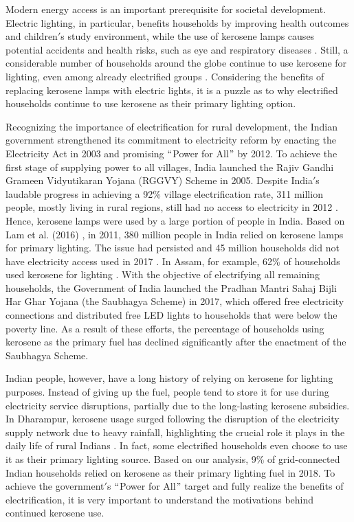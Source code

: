 \documentclass[11pt,english]{article}
\theoremstyle{plain} \newtheorem{claim}{Claim}
\theoremstyle{plain} \newtheorem{prop}{Proposition}
\theoremstyle{plain} \newtheorem{hypo}{Hypothesis}
\begin{document}
Modern energy access is an important prerequisite for societal development. Electric lighting, in particular, benefits households by improving health outcomes and children$'$s study environment, while the use of kerosene lamps causes potential accidents and health risks, such as eye and respiratory diseases \citep{Vandewalleetal2013, BarronTorero2017, Bruceetal2000, Worldbank2008}. Still, a considerable number of households around the globe continue to use kerosene for lighting, even among already electrified groups \citep{Lametal2016}. Considering the benefits of replacing kerosene lamps with electric lights, it is a puzzle as to why electrified households continue to use kerosene as their primary lighting option.

Recognizing the importance of electrification for rural development, the Indian government strengthened its commitment to electricity reform by enacting the Electricity Act in 2003 and promising $``$Power for All$"$ by 2012. To achieve the first stage of supplying power to all villages, India launched the Rajiv Gandhi Grameen Vidyutikaran Yojana (RGGVY) Scheme in 2005. Despite India$'$s laudable progress in achieving a 92\% village electrification rate, 311 million people, mostly living in rural regions, still had no access to electricity in 2012 \citep{Banerjeeetal2014}. Hence, kerosene lamps were used by a large portion of people in India. Based on Lam et al. (2016) \citep{Lametal2016}, in 2011, 380 million people in India relied on kerosene lamps for primary lighting. The issue had persisted and 45 million households did not have electricity access used in 2017 \citep{PalitBandyopadhyay2017}. In Assam, for example, 62\% of households used kerosene for lighting \citep{Barmanetal2017}. With the objective of electrifying all remaining households, the Government of India launched the Pradhan Mantri Sahaj Bijli Har Ghar Yojana (the Saubhagya Scheme) in 2017, which offered free electricity connections and distributed free LED lights to households that were below the poverty line. As a result of these efforts, the percentage of households using kerosene as the primary fuel has declined significantly after the enactment of the Saubhagya Scheme.

Indian people, however, have a long history of relying on kerosene for lighting purposes. Instead of giving up the fuel, people tend to store it for use during electricity service disruptions, partially due to the long-lasting kerosene subsidies. In Dharampur, kerosene usage surged following the disruption of the electricity supply network due to heavy rainfall, highlighting the crucial role it plays in the daily life of rural Indians \citep{Mehta2019}. In fact, some electrified households even choose to use it as their primary lighting source. Based on our analysis, 9\% of grid-connected Indian households relied on kerosene as their primary lighting fuel in 2018. To achieve the government$'$s $``$Power for All$"$ target and fully realize the benefits of electrification, it is very important to understand the motivations behind continued kerosene use.
\end{document}
